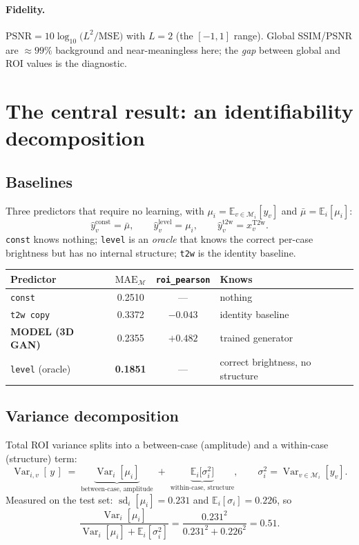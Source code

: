 \documentclass[11pt]{article}
\newcommand{\yhat}{\hat{y}}
\newcommand{\roi}{\mathcal{M}}
\newcommand{\Var}{\operatorname{Var}}
\newcommand{\Ex}{\mathbb{E}}
\newcommand{\1}{\mathbb{1}}
\begin{document}
\paragraph{Fidelity.} $\mathrm{PSNR}=10\log_{10}\!\bigl(L^2/\mathrm{MSE}\bigr)$ with $L=2$
(the $[-1,1]$ range). Global SSIM/PSNR are $\approx99\%$ background and near-meaningless
here; the \emph{gap} between global and ROI values is the diagnostic.

\section{The central result: an identifiability decomposition}

\subsection{Baselines}

Three predictors that require no learning, with $\mu_i=\Ex_{v\in\roi_i}[y_v]$ and
$\bar\mu=\Ex_i[\mu_i]$:
\begin{equation}
\yhat^{\text{const}}_v=\bar\mu ,
\qquad
\yhat^{\text{level}}_v=\mu_i ,
\qquad
\yhat^{\text{t2w}}_v = x^{\text{T2w}}_v .
\end{equation}
\texttt{const} knows nothing; \texttt{level} is an \emph{oracle} that knows the correct
per-case brightness but has no internal structure; \texttt{t2w} is the identity baseline.

\begin{center}
\begin{tabular}{lccl}
\toprule
Predictor & $\mathrm{MAE}_{\roi}$ & \texttt{roi\_pearson} & Knows \\
\midrule
\texttt{const} & 0.2510 & --- & nothing \\
\texttt{t2w copy} & 0.3372 & $\mathbf{-0.043}$ & identity baseline \\
\textbf{MODEL (3D GAN)} & 0.2355 & $\mathbf{+0.482}$ & trained generator \\
\texttt{level} (oracle) & \textbf{0.1851} & --- & correct brightness, no structure \\
\bottomrule
\end{tabular}
\end{center}

\subsection{Variance decomposition}

Total ROI variance splits into a between-case (amplitude) and a within-case (structure) term:
\begin{equation}
\Var_{i,v}[\,y\,] \;=\; \underbrace{\Var_i[\mu_i]}_{\text{between-case, amplitude}}
\;+\; \underbrace{\Ex_i\bigl[\sigma_i^2\bigr]}_{\text{within-case, structure}},
\qquad \sigma_i^2=\Var_{v\in\roi_i}[y_v].
\end{equation}
Measured on the test set: $\operatorname{sd}_i[\mu_i]=0.231$ and $\Ex_i[\sigma_i]=0.226$, so
\begin{equation}
\frac{\Var_i[\mu_i]}{\Var_i[\mu_i]+\Ex_i[\sigma_i^2]}
=\frac{0.231^2}{0.231^2+0.226^2}
=\mathbf{0.51}.
\end{equation}
\end{document}
